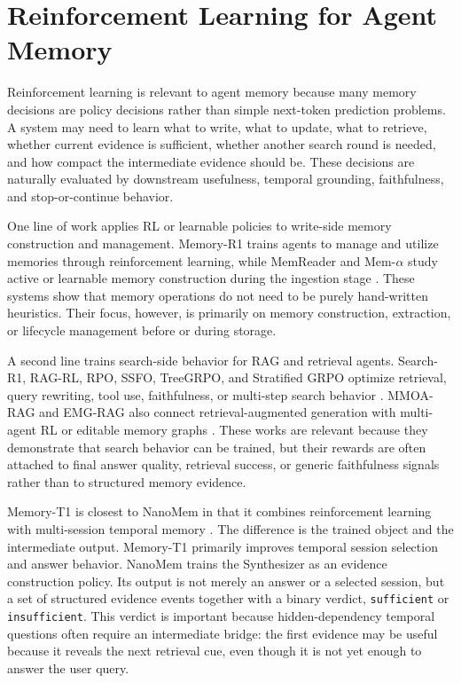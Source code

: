 \section{Reinforcement Learning for Agent Memory}
\label{sec:rw-rl-agent-memory}

Reinforcement learning is relevant to agent memory because many memory
decisions are policy decisions rather than simple next-token prediction
problems. A system may need to learn what to write, what to update, what to
retrieve, whether current evidence is sufficient, whether another search round
is needed, and how compact the intermediate evidence should be. These decisions
are naturally evaluated by downstream usefulness, temporal grounding,
faithfulness, and stop-or-continue behavior.

One line of work applies RL or learnable policies to write-side memory
construction and management. Memory-R1 trains agents to manage and utilize
memories through reinforcement learning, while MemReader and Mem-$\alpha$ study
active or learnable memory construction during the ingestion stage
\cite{yan2025memoryr1,kang2026memreader,wang2025memalpha}. These systems show
that memory operations do not need to be purely hand-written heuristics. Their
focus, however, is primarily on memory construction, extraction, or lifecycle
management before or during storage.

A second line trains search-side behavior for RAG and retrieval agents.
Search-R1, RAG-RL, RPO, SSFO, TreeGRPO, and Stratified GRPO optimize retrieval,
query rewriting, tool use, faithfulness, or multi-step search behavior
\cite{jin2025searchr1,huang2025ragrl,yan2025rpo,tang2025ssfo,ji2026treegrpo,
zhu2025stratifiedgrpo}. MMOA-RAG and EMG-RAG also connect retrieval-augmented
generation with multi-agent RL or editable memory graphs
\cite{chen2025mmoarag,wang2024emgrag}. These works are relevant because they
demonstrate that search behavior can be trained, but their rewards are often
attached to final answer quality, retrieval success, or generic faithfulness
signals rather than to structured memory evidence.

Memory-T1 is closest to NanoMem in that it combines reinforcement learning with
multi-session temporal memory \cite{du2026memoryt1}. The difference is the
trained object and the intermediate output. Memory-T1 primarily improves
temporal session selection and answer behavior. NanoMem trains the Synthesizer
as an evidence construction policy. Its output is not merely an answer or a
selected session, but a set of structured evidence events together with a
binary verdict, \texttt{sufficient} or \texttt{insufficient}. This verdict is
important because hidden-dependency temporal questions often require an
intermediate bridge: the first evidence may be useful because it reveals the
next retrieval cue, even though it is not yet enough to answer the user query.

